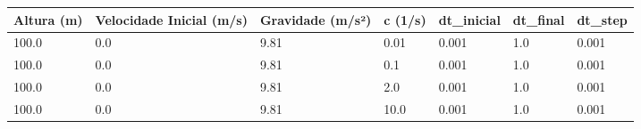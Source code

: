 \begin{tabular}{lllllll}
\toprule
Altura (m) & Velocidade Inicial (m/s) & Gravidade (m/s²) & c (1/s) & dt\_inicial & dt\_final & dt\_step \\
\midrule
100.0 & 0.0 & 9.81 & 0.01 & 0.001 & 1.0 & 0.001 \\
100.0 & 0.0 & 9.81 & 0.1 & 0.001 & 1.0 & 0.001 \\
100.0 & 0.0 & 9.81 & 2.0 & 0.001 & 1.0 & 0.001 \\
100.0 & 0.0 & 9.81 & 10.0 & 0.001 & 1.0 & 0.001 \\
\bottomrule
\end{tabular}
